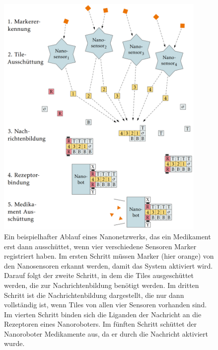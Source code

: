 \begin{figure}
	\centering
	\includegraphics[width=0.9\textwidth]{images/Nanonetzwerk.png}
	\caption[Nanonetzwerk Ablauf Beispiel]{Ein beispielhafter Ablauf eines Nanonetzwerks, das ein Medikament erst dann ausschüttet, wenn vier verschiedene Sensoren Marker registriert haben. 
	Im ersten Schritt müssen Marker (hier orange) von den Nanosensoren erkannt werden, damit das System aktiviert wird. 
	Darauf folgt der zweite Schritt, in dem die Tiles ausgeschüttet werden, die zur Nachrichtenbildung benötigt werden. 
	Im dritten Schritt ist die Nachrichtenbildung dargestellt, die nur dann vollständig ist, wenn Tiles von allen vier Sensoren vorhanden sind. 
	Im vierten Schritt binden sich die Liganden der Nachricht an die Rezeptoren eines Nanoroboters. 
	Im fünften Schritt schüttet der Nanoroboter Medikamente aus, da er durch die Nachricht aktiviert wurde. \cite{lau2020phd}}
	\label{fig:nanonetzwerk_ablauf}
\end{figure}

